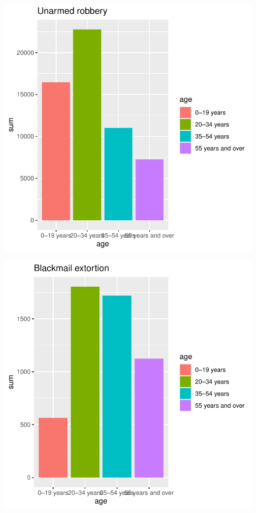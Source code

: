 \documentclass[11pt,a4paper,]{article}
\begin{document}
\includegraphics{report_files/figure-latex/unplot-1.pdf}

\includegraphics{report_files/figure-latex/blaplot-1.pdf}
\end{document}
